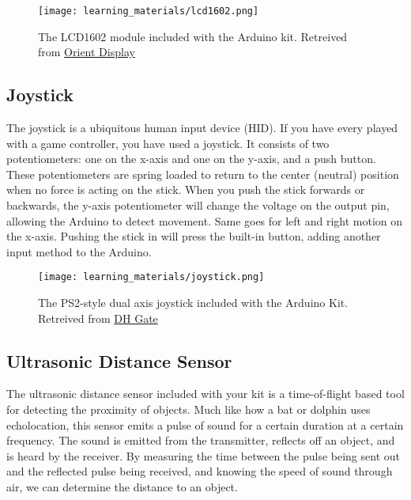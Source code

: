     \begin{figure}[h]
        \texttt{[image: learning\_materials/lcd1602.png]}
        \caption[LCD Module]{The LCD1602 module included with the Arduino kit. 
        Retreived from \href{https://www.orientdisplay.com/wp-content/uploads/2020/08/AMC1602AR-B-B6WTDW-I2C-1.jpg}
        {Orient Display}}
    \end{figure}

    \subsection*{Joystick}
    The joystick is a ubiquitous human input device (HID).
    If you have every played with a game controller, you have used a joystick.
    It consists of two potentiometers: one on the x-axis and one on the y-axis, and a push button.
    These potentiometers are spring loaded to return to the center (neutral) position when no force is acting on the stick.
    When you push the stick forwards or backwards, the y-axis potentiometer will change the voltage on the output pin, allowing the Arduino to detect movement.
    Same goes for left and right motion on the x-axis.
    Pushing the stick in will press the built-in button, adding another input method to the Arduino.

    \begin{figure}[h]
        \texttt{[image: learning\_materials/joystick.png]}
        \caption[LCD Module]{The PS2-style dual axis joystick included with the Arduino Kit. 
        Retreived from \href{https://www.orientdisplay.com/wp-content/uploads/2020/08/AMC1602AR-B-B6WTDW-I2C-1.jpg}
        {DH Gate}}
    \end{figure}


    \subsection*{Ultrasonic Distance Sensor}
    The ultrasonic distance sensor included with your kit is a time-of-flight based tool for detecting the proximity of objects.
    Much like how a bat or dolphin uses echolocation, this sensor emits a pulse of sound for a certain duration at a certain frequency.
    The sound is emitted from the transmitter, reflects off an object, and is heard by the receiver.
    By measuring the time between the pulse being sent out and the reflected pulse being received, and knowing the speed of sound through air, we can determine the distance to an object.
    
